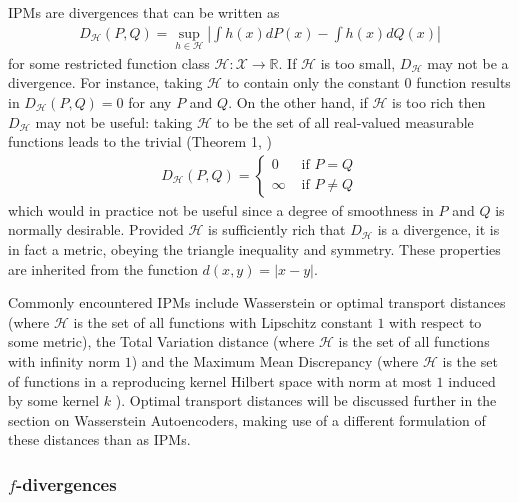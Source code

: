 IPMs are divergences that can be written as
%
\begin{align*}
D_{\mathcal{H}}(P, Q) = \sup_{h\in\mathcal{H}} \left| \int h(x) dP(x) - \int h(x) dQ(x) \right|
\end{align*}
%
for some restricted function class $\mathcal{H}: \mathcal{X} \to \mathbb{R}$. 
If $\mathcal{H}$ is too small, $D_\mathcal{H}$ may not be a divergence.
For instance, taking $\mathcal{H}$ to contain only the constant $0$ function results in $D_{\mathcal{H}}(P, Q) = 0$ for any $P$ and $Q$.
On the other hand, if $\mathcal{H}$ is too rich then $D_{\mathcal{H}}$ may not be useful: 
taking $\mathcal{H}$ to be the set of all real-valued measurable functions leads to the trivial (Theorem 1, \cite{sriperumbudur2009integral})
\begin{align*}
D_{\mathcal{H}}(P, Q) = \begin{cases} 0 &\text{ if } P = Q \\ \infty &\text{ if } P \not= Q\end{cases}
\end{align*}
%
which would in practice not be useful since a degree of smoothness in $P$ and $Q$ is normally desirable.
Provided $\mathcal{H}$ is sufficiently rich that $D_{\mathcal{H}}$ is a divergence, it is in fact a metric, obeying the triangle inequality and symmetry.
These properties are inherited from the function $d(x,y) = |x - y|$.


Commonly encountered IPMs include Wasserstein or optimal transport distances (where $\mathcal{H}$ is the set of all functions with Lipschitz constant $1$ with respect to some metric), the Total Variation distance (where $\mathcal{H}$ is the set of all functions with infinity norm $1$) and the Maximum Mean Discrepancy (where $\mathcal{H}$ is the set of functions in a reproducing kernel Hilbert space with norm at most $1$ induced by some kernel $k$ \cite{gretton}). 
Optimal transport distances will be discussed further in the section on Wasserstein Autoencoders, making use of a different formulation of these distances than as IPMs.

\subsubsection{$f$-divergences}

